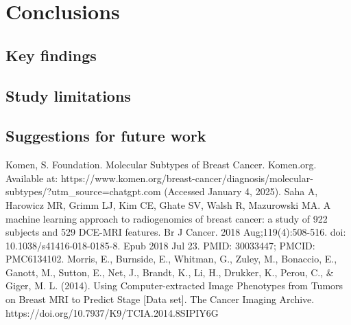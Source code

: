 \documentclass[conference]{IEEEtran}
\begin{document}
\section{Conclusions}

\subsection{Key findings}

\subsection{Study limitations}


\subsection{Suggestions for future work}

\begin{thebibliography}{00}
 Komen, S. Foundation. Molecular Subtypes of Breast Cancer. Komen.org. Available at: https://www.komen.org/breast-cancer/diagnosis/molecular-subtypes/?utm\_source=chatgpt.com (Accessed January 4, 2025).
 Saha A, Harowicz MR, Grimm LJ, Kim CE, Ghate SV, Walsh R, Mazurowski MA. A machine learning approach to radiogenomics of breast cancer: a study of 922 subjects and 529 DCE-MRI features. Br J Cancer. 2018 Aug;119(4):508-516. doi: 10.1038/s41416-018-0185-8. Epub 2018 Jul 23. PMID: 30033447; PMCID: PMC6134102.
 Morris, E., Burnside, E., Whitman, G., Zuley, M., Bonaccio, E., Ganott, M., Sutton, E., Net, J., Brandt, K., Li, H., Drukker, K., Perou, C., \& Giger, M. L. (2014). Using Computer-extracted Image Phenotypes from Tumors on Breast MRI to Predict Stage [Data set]. The Cancer Imaging Archive. https://doi.org/10.7937/K9/TCIA.2014.8SIPIY6G
\end{thebibliography}
\end{document}
